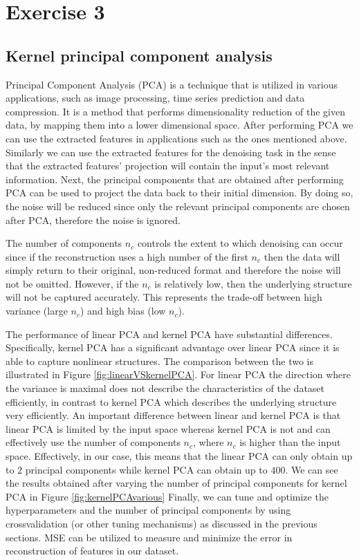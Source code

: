 \documentclass[a4paper, 11pt, one column]{article}
\begin{document}
\section{Exercise 3}
\subsection{Kernel principal component analysis}
Principal Component Analysis (PCA) is a technique that is utilized in various applications, such as image processing, time series prediction and data compression. It is a method that performs dimensionality reduction of the given data, by mapping them into a lower dimensional space. After performing PCA we can use the extracted features in applications such as the ones mentioned above. Similarly we can use the extracted features for the denoising task in the sense that the extracted features' projection will contain the input's most relevant information. Next, the principal components that are obtained after performing PCA can be used to project the data back to their initial dimension. By doing so, the noise will be reduced since only the relevant principal components are chosen after PCA, therefore the noise is ignored. 

The number of components $n_c$ controls the extent to which denoising can occur since if the reconstruction uses a high number of the first $n_c$ then the data will simply return to their original, non-reduced format and therefore the noise will not be omitted. However, if the $n_c$ is relatively low, then the underlying structure will not be captured accurately. This represents the trade-off between high variance (large $n_c$) and high bias (low $n_c$).


The performance of linear PCA and kernel PCA have substantial differences. Specifically, kernel PCA has a significant advantage over linear PCA since it is able to capture nonlinear structures. The comparison between the two is illustrated in Figure \ref{fig:linearVSkernelPCA}. For linear PCA the direction where the variance is maximal does not describe the characteristics of the dataset efficiently, in contrast to kernel PCA which describes the underlying structure very efficiently. An important difference between linear and kernel PCA is that linear PCA is limited by the input space whereas kernel PCA is not and can effectively use the number of components $n_c$, where $n_c$ is higher than the input space. Effectively, in our case, this means that the linear PCA can only obtain up to $2$ principal components while kernel PCA can obtain up to $400$. We can see the results obtained after varying the number of principal components for kernel PCA in Figure \ref{fig:kernelPCAvarious}
Finally, we can tune and optimize the hyperparameters and the number of principal components by using crossvalidation (or other tuning mechanisms) as discussed in the previous sections. MSE can be utilized to measure and minimize the error in reconstruction of features in our dataset. 
\end{document}
